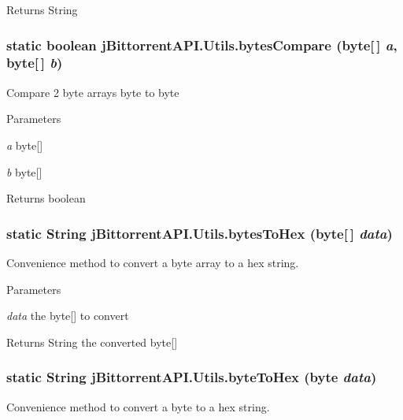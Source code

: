 \begin{DoxyReturn}{Returns}
String 
\end{DoxyReturn}
\hypertarget{classj_bittorrent_a_p_i_1_1_utils_a082c4145565ec408c591c1fef4d00163}{
\subsubsection[{bytesCompare}]{\setlength{\rightskip}{0pt plus 5cm}static boolean jBittorrentAPI.Utils.bytesCompare (byte\mbox{[}$\,$\mbox{]} {\em a}, \/  byte\mbox{[}$\,$\mbox{]} {\em b})}}
\label{classj_bittorrent_a_p_i_1_1_utils_a082c4145565ec408c591c1fef4d00163}
Compare 2 byte arrays byte to byte 
\begin{DoxyParams}{Parameters}
\item[{\em a}]byte\mbox{[}\mbox{]} \item[{\em b}]byte\mbox{[}\mbox{]} \end{DoxyParams}
\begin{DoxyReturn}{Returns}
boolean 
\end{DoxyReturn}
\hypertarget{classj_bittorrent_a_p_i_1_1_utils_ae1ee27863feabe06ebda7c855645c326}{
\subsubsection[{bytesToHex}]{\setlength{\rightskip}{0pt plus 5cm}static String jBittorrentAPI.Utils.bytesToHex (byte\mbox{[}$\,$\mbox{]} {\em data})}}
\label{classj_bittorrent_a_p_i_1_1_utils_ae1ee27863feabe06ebda7c855645c326}
Convenience method to convert a byte array to a hex string.


\begin{DoxyParams}{Parameters}
\item[{\em data}]the byte\mbox{[}\mbox{]} to convert \end{DoxyParams}
\begin{DoxyReturn}{Returns}
String the converted byte\mbox{[}\mbox{]} 
\end{DoxyReturn}
\hypertarget{classj_bittorrent_a_p_i_1_1_utils_a41501f3bae8b3053a2bafb43e48fc51c}{
\subsubsection[{byteToHex}]{\setlength{\rightskip}{0pt plus 5cm}static String jBittorrentAPI.Utils.byteToHex (byte {\em data})}}
\label{classj_bittorrent_a_p_i_1_1_utils_a41501f3bae8b3053a2bafb43e48fc51c}
Convenience method to convert a byte to a hex string.


